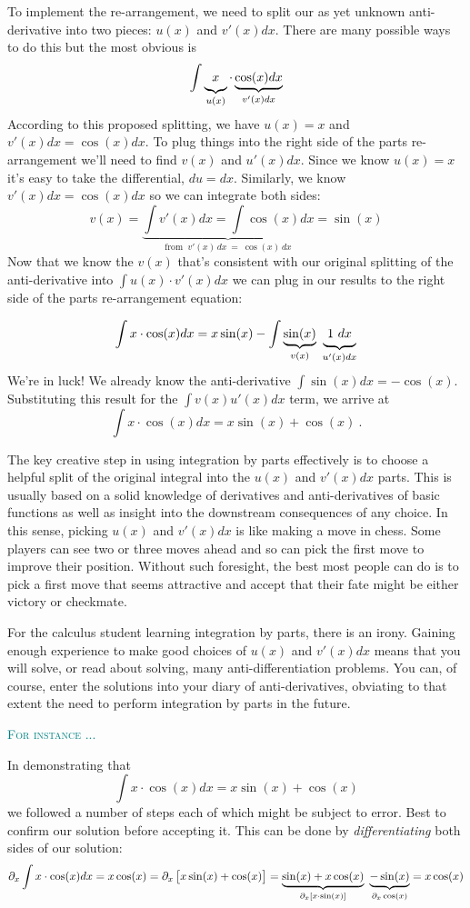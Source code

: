 \documentclass[
  letterpaper,
  DIV=11,
  numbers=noendperiod,
  oneside]{scrreprt}
\newenvironment{example}%
{%
\textcolor{teal}{\hrulefill}%
  \par\vspace{.3\baselineskip}%
  \textcolor{teal}{\scshape For instance ...}%
  \par\vspace{\baselineskip}%
}%
{\textcolor{teal}{\hrulefill}}
\begin{document}
To implement the re-arrangement, we need to split our as yet unknown
anti-derivative into two pieces: \(u(x)\) and \(v'(x) dx\). There are
many possible ways to do this but the most obvious is
\[\int \underbrace{\strut x}_{u(x)} \cdot \underbrace{\cos(x) dx}_{v'(x) dx}\]
According to this proposed splitting, we have \(u(x) = x\) and
\(v'(x) dx = \cos(x) dx\). To plug things into the right side of the
parts re-arrangement we'll need to find \(v(x)\) and \(u'(x) dx\). Since
we know \(u(x) = x\) it's easy to take the differential, \(du = dx\).
Similarly, we know \(v'(x) dx = \cos(x) dx\) so we can integrate both
sides:
\[v(x) = \underbrace{\int v'(x) dx = \int \cos(x) dx}_{\text{from }\ v'(x)\,dx\ =\ \cos(x)\,dx} = \sin(x)\]
Now that we know the \(v(x)\) that's consistent with our original
splitting of the anti-derivative into \(\int u(x) \cdot v'(x) dx\) we
can plug in our results to the right side of the parts re-arrangement
equation:

\[\int x \cdot \cos(x)dx = x \sin(x) - \int \underbrace{\sin(x)}_{v(x)}\  \underbrace{\ 1\ dx\ \strut}_{u'(x) dx}\]
We're in luck! We already know the anti-derivative
\(\int \sin(x) dx = -\cos(x)\). Substituting this result for the
\(\int v(x) u'(x) dx\) term, we arrive at
\[\int x \cdot \cos(x)dx = x \sin(x) + \cos(x)\ .\]

The key creative step in using integration by parts effectively is to
choose a helpful split of the original integral into the \(u(x)\) and
\(v'(x) dx\) parts. This is usually based on a solid knowledge of
derivatives and anti-derivatives of basic functions as well as insight
into the downstream consequences of any choice. In this sense, picking
\(u(x)\) and \(v'(x)dx\) is like making a move in chess. Some players
can see two or three moves ahead and so can pick the first move to
improve their position. Without such foresight, the best most people can
do is to pick a first move that seems attractive and accept that their
fate might be either victory or checkmate.

For the calculus student learning integration by parts, there is an
irony. Gaining enough experience to make good choices of \(u(x)\) and
\(v'(x)dx\) means that you will solve, or read about solving, many
anti-differentiation problems. You can, of course, enter the solutions
into your diary of anti-derivatives, obviating to that extent the need
to perform integration by parts in the future.

\begin{example}
In demonstrating that \[\int x \cdot \cos(x)dx = x \sin(x) + \cos(x)\]
we followed a number of steps each of which might be subject to error.
Best to confirm our solution before accepting it. This can be done by
\emph{differentiating} both sides of our solution:
\[\partial_x \int x \cdot \cos(x)dx = x \cos(x) = \partial_x \left[\strut x \sin(x) + \cos(x)\right] = \underbrace{\sin(x) + x \cos(x)}_{\partial_x \left[x\cdot\sin(x)\right]}\  \underbrace{- \sin(x)}_{\partial_x \cos(x)}= x\cos(x)\]

\end{example}
\end{document}
